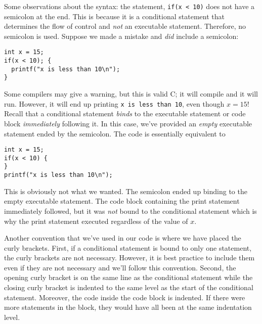 Some observations about the syntax: the statement, \texttt{if(x < 10)}
does not have a semicolon at the end.  This is because it is a conditional statement
that determines the flow of control and \emph{not} an executable statement.  
Therefore, no semicolon is used.  Suppose we made a mistake and \emph{did}
include a semicolon:

\begin{verbatim}
int x = 15;
if(x < 10); {
  printf("x is less than 10\n");
}
\end{verbatim}

Some compilers may give a warning, but this is valid C; it will compile and it 
will run.  However, it will end up printing \texttt{x is less than 10}, even
though $x = 15$!  Recall that a conditional statement \emph{binds} to the 
executable statement or code block \emph{immediately} following it.  In this
case, we've provided an \emph{empty} executable statement ended by the
semicolon.  The code is essentially equivalent to 

\begin{verbatim}
int x = 15;
if(x < 10) {
}
printf("x is less than 10\n");
\end{verbatim}

This is obviously not what we wanted.  The semicolon ended up binding 
to the empty executable statement.  The code block containing the
print statement immediately followed, but it was \emph{not} bound to the
conditional statement which is why the print statement executed regardless
of the value of $x$.

Another convention that we've used in our code is where we have placed the
curly brackets.  First, if a conditional statement is bound to only one statement, 
the curly brackets are not necessary.  However, it is best practice to include them
even if they are not necessary and we'll follow this convention.  Second, the
opening curly bracket is on the same line as the conditional statement while
the closing curly bracket is indented to the same level as the start of the
conditional statement.  Moreover, the code inside the code block is indented.
If there were more statements in the block, they would have all been at the
same indentation level.

